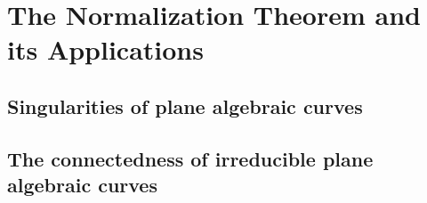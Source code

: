 \chapter{The Normalization Theorem and its Applications}
\section{Singularities of plane algebraic curves}
\section{The connectedness of irreducible plane algebraic curves}
